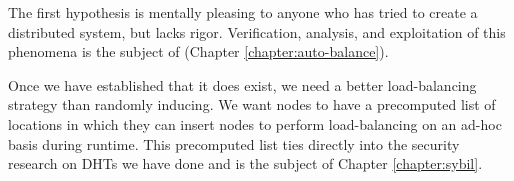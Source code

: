 The first hypothesis is mentally pleasing to anyone who has tried to create a distributed system, but lacks rigor.
Verification, analysis, and exploitation of this phenomena is  the subject of (Chapter \ref{chapter:auto-balance}).


Once we have established that it does exist, we need a better load-balancing strategy than randomly inducing.
We want nodes to have a precomputed list of locations in which they can insert nodes to perform load-balancing on an ad-hoc basis during runtime.
This precomputed list ties directly into the security research on DHTs we have done \cite{sybil-analysis} and is the subject of Chapter \ref{chapter:sybil}.